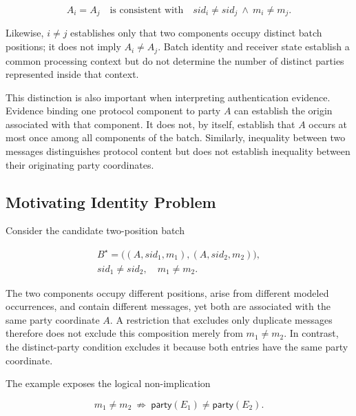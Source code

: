 \begin{equation}
  A_i=A_j
  \quad\text{is consistent with}\quad
  \mathit{sid}_i\neq\mathit{sid}_j
  \ \land\ 
  m_i\neq m_j.
  \label{eq:same-party-different-message}
\end{equation}

Likewise, $i\neq j$ establishes only that two components occupy distinct batch
positions; it does not imply $A_i\neq A_j$. Batch identity and receiver state
establish a common processing context but do not determine the number of
distinct parties represented inside that context.

This distinction is also important when interpreting authentication evidence.
Evidence binding one protocol component to party $A$ can establish the origin
associated with that component. It does not, by itself, establish that $A$
occurs at most once among all components of the batch. Similarly, inequality
between two messages distinguishes protocol content but does not establish
inequality between their originating party coordinates.

\subsection{Motivating Identity Problem}

Consider the candidate two-position batch

\begin{equation}
  \begin{gathered}
  B^{\star}
  =\bigl((A,\mathit{sid}_1,m_1),
          (A,\mathit{sid}_2,m_2)\bigr),
  \\
  \mathit{sid}_1\neq\mathit{sid}_2,
  \quad m_1\neq m_2.
  \end{gathered}
  \label{eq:motivating-composition}
\end{equation}

The two components occupy different positions, arise from different modeled
occurrences, and contain different messages, yet both are associated with the
same party coordinate $A$. A restriction that excludes only duplicate
messages therefore does not exclude this composition merely from
$m_1\neq m_2$. In contrast, the distinct-party condition excludes it because
both entries have the same party coordinate.

The example exposes the logical non-implication

\begin{equation}
  m_1\neq m_2
  \ \not\Longrightarrow\ 
  \mathsf{party}(E_1)\neq\mathsf{party}(E_2).
  \label{eq:message-does-not-imply-party}
\end{equation}

